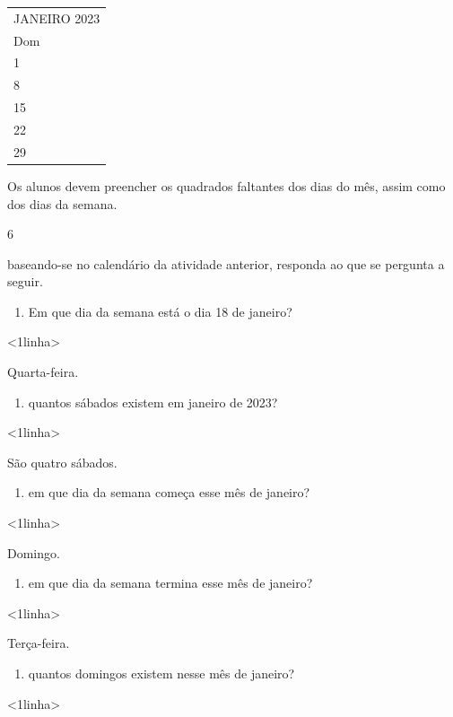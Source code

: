 \begin{longtable}[]{@{}l@{}}
\toprule
JANEIRO 2023\tabularnewline
Dom\tabularnewline
1\tabularnewline
8\tabularnewline
15\tabularnewline
22\tabularnewline
29\tabularnewline
\bottomrule
\end{longtable}

Os alunos devem preencher os quadrados faltantes dos
dias do mês, assim como dos dias da semana.

\num{6}

baseando-se no calendário da atividade anterior, responda ao que se pergunta a seguir.

\begin{enumerate}
\def\labelenumi{\Alph{enumi})}
\item
  Em que dia da semana está o dia 18 de janeiro?
\end{enumerate}

\textless{}1linha\textgreater{}

Quarta-feira.

\begin{enumerate}
\def\labelenumi{\Alph{enumi})}
\item
  quantos sábados existem em janeiro de 2023?
\end{enumerate}

\textless{}1linha\textgreater{}

São quatro sábados.

\begin{enumerate}
\def\labelenumi{\Alph{enumi})}
\item
  em que dia da semana começa esse mês de janeiro?
\end{enumerate}

\textless{}1linha\textgreater{}

Domingo.

\begin{enumerate}
\def\labelenumi{\Alph{enumi})}
\item
  em que dia da semana termina esse mês de janeiro?
\end{enumerate}

\textless{}1linha\textgreater{}

Terça-feira.

\begin{enumerate}
\def\labelenumi{\Alph{enumi})}
\item
  quantos domingos existem nesse mês de janeiro?
\end{enumerate}

\textless{}1linha\textgreater{}

